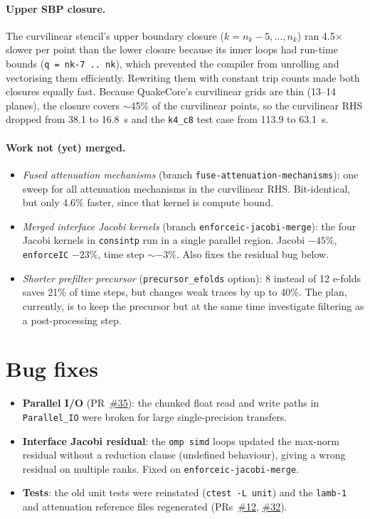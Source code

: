 \documentclass[11pt,a4paper]{article}
\newcommand{\pr}[1]{\href{https://github.com/ucgmsim/sw4/pull/#1}{\#{#1}}}
\newcommand{\code}[1]{\texttt{#1}}
\begin{document}
\paragraph{Upper SBP closure.}
The curvilinear stencil's upper boundary closure ($k=n_k-5,\dots,n_k$) ran
4.5$\times$ slower per point than the lower closure because its inner loops
had run-time bounds (\code{q = nk-7 .. nk}), which prevented the compiler from
unrolling and vectorising them efficiently. Rewriting them with constant trip
counts made both closures equally fast. Because QuakeCore's curvilinear grids
are thin (13--14 planes), the closure covers $\sim$45\% of the curvilinear
points, so the curvilinear RHS dropped from 38.1 to 16.8~s and the
\code{k4\_c8} test case from 113.9 to 63.1~s.

\paragraph{Work not (yet) merged.}
\begin{itemize}[itemsep=0pt]
  \item \emph{Fused attenuation mechanisms} (branch
    \code{fuse-attenuation-mechanisms}): one sweep for all attenuation
    mechanisms in the curvilinear RHS. Bit-identical, but only 4.6\% faster,
    since that kernel is compute bound.
  \item \emph{Merged interface Jacobi kernels} (branch
    \code{enforceic-jacobi-merge}): the four Jacobi kernels in \code{consintp}
    run in a single parallel region. Jacobi $-45\%$, \code{enforceIC}
    $-23\%$, time step $\sim-3\%$. Also fixes the residual bug below.
  \item \emph{Shorter prefilter precursor} (\code{precursor\_efolds} option):
    8 instead of 12 e-folds saves 21\% of time steps, but changes weak traces
    by up to 40\%. The plan, currently, is to keep the precursor but at the same time
    investigate filtering as a post-processing step.
\end{itemize}

\section{Bug fixes}
\label{sec:bugs}
\begin{itemize}[itemsep=2pt]
  \item \textbf{Parallel I/O} (PR~\pr{35}): the chunked float read and write
        paths in \code{Parallel\_IO} were broken for large single-precision
        transfers.
  \item \textbf{Interface Jacobi residual}: the \code{omp simd} loops updated
        the max-norm residual without a reduction clause (undefined behaviour),
        giving a wrong residual on multiple ranks. Fixed on
        \code{enforceic-jacobi-merge}.
  \item \textbf{Tests}: the old unit tests were reinstated
        (\code{ctest -L unit}) and the \code{lamb-1} and attenuation reference
        files regenerated (PRs~\pr{12}, \pr{32}).
\end{itemize}
\end{document}

